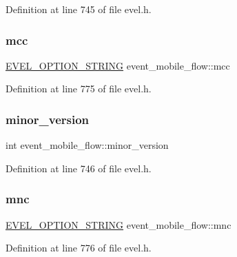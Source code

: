 Definition at line 745 of file evel.\+h.

\hypertarget{structevent__mobile__flow_a1905de94c6a3ead7a453f561f17feb77}{}\label{structevent__mobile__flow_a1905de94c6a3ead7a453f561f17feb77} 
\subsubsection{\texorpdfstring{mcc}{mcc}}
{\footnotesize\ttfamily \hyperlink{evel_8h_a0de5113a7b72de93c0c7b644f7ea7ec3}{E\+V\+E\+L\+\_\+\+O\+P\+T\+I\+O\+N\+\_\+\+S\+T\+R\+I\+NG} event\+\_\+mobile\+\_\+flow\+::mcc}



Definition at line 775 of file evel.\+h.

\hypertarget{structevent__mobile__flow_ac1abe71a2434db6c55850ee9a0585d20}{}\label{structevent__mobile__flow_ac1abe71a2434db6c55850ee9a0585d20} 
\subsubsection{\texorpdfstring{minor\+\_\+version}{minor\_version}}
{\footnotesize\ttfamily int event\+\_\+mobile\+\_\+flow\+::minor\+\_\+version}



Definition at line 746 of file evel.\+h.

\hypertarget{structevent__mobile__flow_abc8c594121f138f4bd98e7e90063c287}{}\label{structevent__mobile__flow_abc8c594121f138f4bd98e7e90063c287} 
\subsubsection{\texorpdfstring{mnc}{mnc}}
{\footnotesize\ttfamily \hyperlink{evel_8h_a0de5113a7b72de93c0c7b644f7ea7ec3}{E\+V\+E\+L\+\_\+\+O\+P\+T\+I\+O\+N\+\_\+\+S\+T\+R\+I\+NG} event\+\_\+mobile\+\_\+flow\+::mnc}



Definition at line 776 of file evel.\+h.

\hypertarget{structevent__mobile__flow_a22041860a791e790c2bff4736f074b13}{}\label{structevent__mobile__flow_a22041860a791e790c2bff4736f074b13} 
